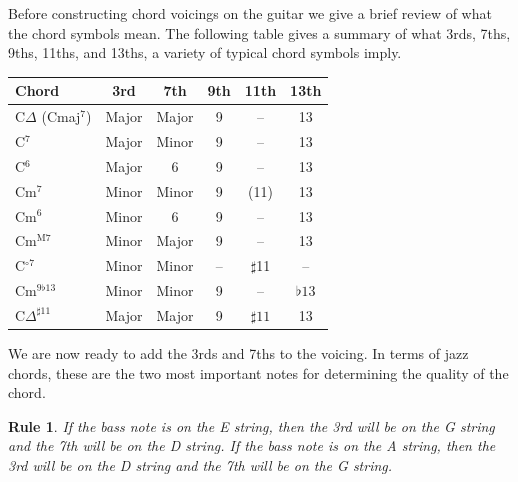 \documentclass[12pt]{article}
\newtheorem{nrule}{Rule}
\theoremstyle{definition}
\begin{document}
Before constructing chord voicings on the guitar we give a brief review of what the chord symbols mean. The following table gives a summary of what 3rds, 7ths, 9ths, 11ths, and 13ths, a variety of typical chord symbols imply. 

\begin{center}
\begin{tabular}{|l|c|c|c|c|c|}
\hline
Chord & 3rd & 7th & 9th & 11th & 13th \\
\hline
C$\Delta$  (Cmaj$^7$)               & Major & Major & 9  & --           & 13         \\
C$^7$                     & Major & Minor & 9  & --           & 13         \\
C$^6$                     & Major & 6     & 9  & --           & 13         \\
Cm$^7$                    & Minor & Minor & 9  & (11)         & 13         \\
Cm$^6$                    & Minor & 6     & 9  & --           & 13         \\
Cm$^{\mathrm{M}7}$        & Minor & Major & 9  & --           & 13         \\
C$^{\circ 7}$ & Minor & Minor & -- & $\sharp$11 & -- \\
Cm$^{9\flat13}$           & Minor & Minor & 9  & --           & $\flat13$  \\
C$\Delta^{\sharp11}$      & Major & Major & 9  & $\sharp11$   & 13         \\
\hline
\end{tabular}
\end{center}

We are now ready to add the 3rds and 7ths to the voicing. In terms of jazz chords, these are the two most important notes for determining the quality of the chord. 

\begin{nrule}
If the bass note is on the E string, then the 3rd will be on the G string and the 7th will be on the D string. If the bass note is on the A string, then the 3rd will be on the D string and the 7th will be on the G string. 
\end{nrule}

\noindent
\begin{minipage}{0.5\textwidth}
\end{minipage}
\begin{minipage}{0.5\textwidth}
\end{minipage}
\end{document}
